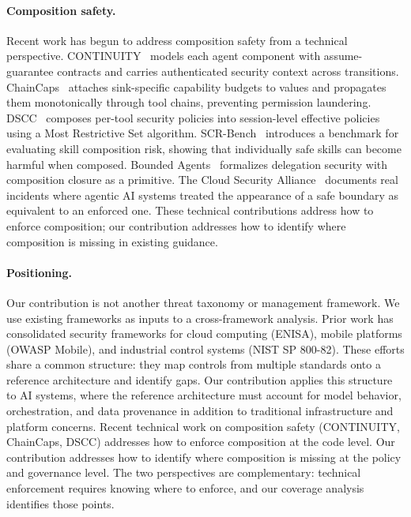 \documentclass[runningheads]{llncs}
\begin{document}
\paragraph{Composition safety.}
Recent work has begun to address composition safety from a technical perspective. CONTINUITY~\cite{continuity2026} models each agent component with assume-guarantee contracts and carries authenticated security context across transitions. ChainCaps~\cite{chaincaps2026} attaches sink-specific capability budgets to values and propagates them monotonically through tool chains, preventing permission laundering. DSCC~\cite{dscc2026} composes per-tool security policies into session-level effective policies using a Most Restrictive Set algorithm. SCR-Bench~\cite{scrbench2026} introduces a benchmark for evaluating skill composition risk, showing that individually safe skills can become harmful when composed. Bounded Agents~\cite{boundedagents2026} formalizes delegation security with composition closure as a primitive. The Cloud Security Alliance~\cite{csa2026trustboundary} documents real incidents where agentic AI systems treated the appearance of a safe boundary as equivalent to an enforced one. These technical contributions address how to enforce composition; our contribution addresses how to identify where composition is missing in existing guidance.

\paragraph{Positioning.}
Our contribution is not another threat taxonomy or management framework. We use existing frameworks as inputs to a cross-framework analysis. Prior work has consolidated security frameworks for cloud computing (ENISA), mobile platforms (OWASP Mobile), and industrial control systems (NIST SP 800-82). These efforts share a common structure: they map controls from multiple standards onto a reference architecture and identify gaps. Our contribution applies this structure to AI systems, where the reference architecture must account for model behavior, orchestration, and data provenance in addition to traditional infrastructure and platform concerns. Recent technical work on composition safety (CONTINUITY, ChainCaps, DSCC) addresses how to enforce composition at the code level. Our contribution addresses how to identify where composition is missing at the policy and governance level. The two perspectives are complementary: technical enforcement requires knowing where to enforce, and our coverage analysis identifies those points.
\end{document}
